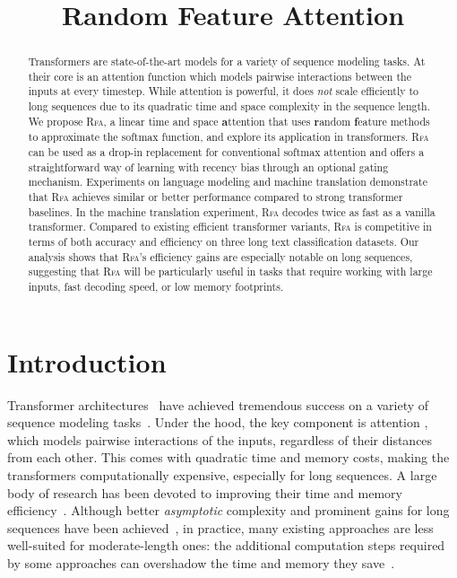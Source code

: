 \title{Random Feature Attention}

\begin{abstract}
Transformers are state-of-the-art models for a variety of sequence modeling tasks. At their core is an attention function which models pairwise interactions between the inputs at every timestep. While attention is powerful, it does \emph{not} scale efficiently to long sequences due to its quadratic time and space complexity in the sequence length. We propose \textsc{Rfa}, 
    a linear time and space
    \textbf{a}ttention that uses \textbf{r}andom \textbf{f}eature methods to approximate the softmax function, and explore its application in transformers.
    \textsc{Rfa} can be used as a drop-in replacement for conventional softmax attention and offers a straightforward way of learning with recency bias through an optional gating mechanism. Experiments on language modeling and machine translation demonstrate that \textsc{Rfa}
    achieves similar or better performance compared to strong transformer baselines. In the machine translation experiment,
    \textsc{Rfa} decodes twice as fast as a vanilla transformer. Compared to existing efficient transformer variants, 
    \textsc{Rfa} is competitive in terms of both accuracy and efficiency on three long text classification datasets. Our analysis shows that 
    \textsc{Rfa}'s efficiency gains are especially notable on long sequences, suggesting that \textsc{Rfa} will be particularly useful in tasks that require working with large inputs, fast decoding speed, or low memory footprints.
\end{abstract}

\section{Introduction}
Transformer architectures~\citep{vaswani2017attention} have achieved tremendous success on a variety of sequence modeling
tasks~\citep[\emph{inter alia}]{ott2018scaling,radford2018language,parmar2018image,delvin2019bert,parisotto2019stabilizing}. Under the hood, the key component is attention \citep{bahdanau2015attention}, which models pairwise interactions of the inputs, regardless of their distances from each other. This comes with quadratic time and memory costs, making the transformers computationally expensive, especially for long sequences. A large body of research has been devoted to improving their time and memory efficiency~\citep{tay2020}. Although better \emph{asymptotic} complexity and prominent gains for long sequences have been achieved~\citep[\emph{inter alia}]{lee2019set,child2019generating,beltagy2020longformer}, in practice, many existing approaches are less well-suited for moderate-length ones: the additional computation steps required by some approaches can  overshadow the time and memory they save~\citep[\emph{inter alia}]{kitaev2020reformer,wang2020linformer,roy2020efficient}.

